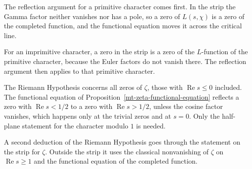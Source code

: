 The reflection argument for a primitive character comes first. In the strip the Gamma factor neither
vanishes nor has a pole, so a zero of $L(s,\chi)$ is a zero of the completed function, and the
functional equation moves it across the critical line.

For an imprimitive character, a zero in the strip is a zero of the $L$-function of the primitive
character, because the Euler factors do not vanish there. The reflection argument then applies to
that primitive character.

The Riemann Hypothesis concerns all zeros of $\zeta$, those with $\operatorname{Re}s\leq0$
included. The functional equation of Proposition~\ref{mt-zeta-functional-equation} reflects a zero
with $\operatorname{Re}s<1/2$ to a zero with $\operatorname{Re}s>1/2$, unless the cosine factor
vanishes, which happens only at the trivial zeros and at $s=0$. Only the half-plane statement for the character modulo $1$ is needed.

A second deduction of the Riemann Hypothesis goes through the statement on the strip for $\zeta$.
Outside the strip it uses the classical nonvanishing of $\zeta$ on $\operatorname{Re}s\geq1$ and
the functional equation of the completed function.
